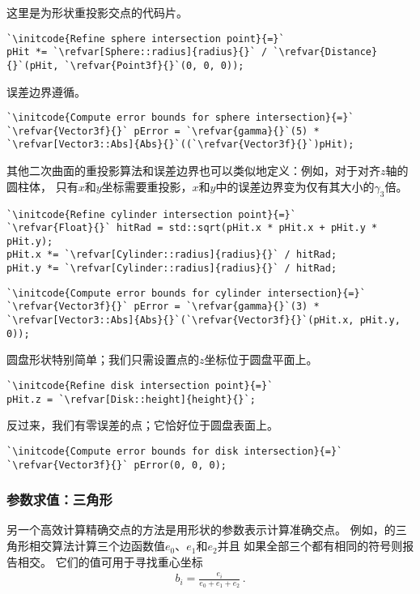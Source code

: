 这里是为形状重投影交点的代码片。
\begin{lstlisting}
`\initcode{Refine sphere intersection point}{=}`
pHit *= `\refvar[Sphere::radius]{radius}{}` / `\refvar{Distance}{}`(pHit, `\refvar{Point3f}{}`(0, 0, 0));
\end{lstlisting}

误差边界遵循。
\begin{lstlisting}
`\initcode{Compute error bounds for sphere intersection}{=}`
`\refvar{Vector3f}{}` pError = `\refvar{gamma}{}`(5) * `\refvar[Vector3::Abs]{Abs}{}`((`\refvar{Vector3f}{}`)pHit);
\end{lstlisting}

其他二次曲面的重投影算法和误差边界也可以类似地定义：例如，对于对齐$z$轴的圆柱体，
只有$x$和$y$坐标需要重投影，$x$和$y$中的误差边界变为仅有其大小的$\gamma_3$倍。
\begin{lstlisting}
`\initcode{Refine cylinder intersection point}{=}`
`\refvar{Float}{}` hitRad = std::sqrt(pHit.x * pHit.x + pHit.y * pHit.y);
pHit.x *= `\refvar[Cylinder::radius]{radius}{}` / hitRad;
pHit.y *= `\refvar[Cylinder::radius]{radius}{}` / hitRad;
\end{lstlisting}
\begin{lstlisting}
`\initcode{Compute error bounds for cylinder intersection}{=}`
`\refvar{Vector3f}{}` pError = `\refvar{gamma}{}`(3) * `\refvar[Vector3::Abs]{Abs}{}`(`\refvar{Vector3f}{}`(pHit.x, pHit.y, 0));
\end{lstlisting}

圆盘形状特别简单；我们只需设置点的$z$坐标位于圆盘平面上。
\begin{lstlisting}
`\initcode{Refine disk intersection point}{=}`
pHit.z = `\refvar[Disk::height]{height}{}`;
\end{lstlisting}

反过来，我们有零误差的点；它恰好位于圆盘表面上。
\begin{lstlisting}
`\initcode{Compute error bounds for disk intersection}{=}`
`\refvar{Vector3f}{}` pError(0, 0, 0);
\end{lstlisting}

\subsubsection*{参数求值：三角形}
另一个高效计算精确交点的方法是用形状的参数表示计算准确交点。
例如，的三角形相交算法计算三个边函数值$e_0$、$e_1$和$e_2$并且
如果全部三个都有相同的符号则报告相交。
它们的值可用于寻找重心坐标
\begin{align*}
    b_i=\frac{e_i}{e_0+e_1+e_2}\, .
\end{align*}

